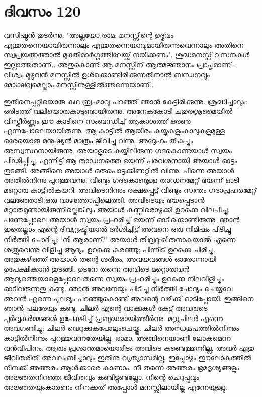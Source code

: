 \newpage
\section{ദിവസം 120}


വസിഷ്ഠന്‍ തുടര്‍ന്നു: "അല്ലയോ രാമ: മനസ്സിന്റെ ഉദ്ഭവം എന്തുതന്നെയായിരുന്നാലും എന്തുതന്നെയാവുമായിരുന്നുവെന്നാലും അതിനെ സ്വപ്രയത്നത്താല്‍ മുക്തിമാര്‍ഗ്ഗത്തിലേയ്ക്ക്‌ നയിക്കണം". ശുദ്ധമനസ്സ്‌ വസനകള്‍ ഇല്ലാത്തതാണ്‌.. അതുകൊണ്ട്‌ ആ മനസ്സിന്‌ ആത്മജ്ഞാനം പ്രാപ്തമാണ്‌.. വിശ്വം മുഴുവന്‍ മനസ്സില്‍ ഉള്‍ക്കൊണ്ടിരിക്കുന്നതിനാല്‍ ബന്ധനവും മോക്ഷവുമെല്ലാം മനസ്സിനുള്ളില്‍ത്തന്നെയാണ്‌..

ഇതിനെപ്പറ്റിയൊരു കഥ ബ്രഹ്മാവു പറഞ്ഞ്‌ ഞാന്‍ കേട്ടിരിക്കുന്നു. ശ്രദ്ധിച്ചാലും: ഒരിടത്ത്‌ വലിയൊരുകാടുണ്ടായിരുന്നു. അനേകകോടി ചതുരശ്രമൈയില്‍ വിസ്തീര്‍ണ്ണം ഈ കാടിനെ സംബന്ധിച്ച്‌ ആകാശത്ത്‌ ഒരണു എന്നപോലെയായിരുന്നു. ആ കാട്ടില്‍ ആയിരം കയ്യുകളുംകാലുകളുമുള്ള ഒരേയൊരു മനുഷ്യന്‍ മാത്രം ജീവിച്ചു വന്നു. അദ്ദേഹം തികച്ചും അസ്വസ്ഥനായിരുന്നു. അയാളുടെ കയ്യിലിരുന്ന ഗദകൊണ്ടയാള്‍ സ്വയം പീഢിപ്പിച്ചു. എന്നിട്ട്‌ ആ താഡനത്തെ ഭയന്ന് പരവശനായി അയാള്‍ ഓട്ടം തുടങ്ങി. അങ്ങിനെ അയാള്‍ ഒരുപൊട്ടക്കിണറ്റില്‍ വീണു. പിന്നെ അയാള്‍ അതില്‍നിന്നു പുറത്തുവന്നു; വീണ്ടും ഗദകൊണ്ടുള്ള താഡനമേറ്റ്‌ ഭയന്ന് ഓടി മറ്റൊരു കാട്ടില്‍കയറി. അവിടെനിന്നും രക്ഷപ്പെട്ട്‌ വീണ്ടും സ്വന്തം ഗദാപ്രഹരമേറ്റ്‌ വലഞ്ഞോടി ഒരു വാഴത്തോപ്പിലെത്തി. അവിടെയും  ഭയപ്പെടാന്‍ മറ്റാരുമുണ്ടായിരുന്നില്ലെങ്കിലും അയാള്‍ കണ്ണീരൊഴുക്കി ഉറക്കെ വിലപിച്ചു. പണ്ടേപ്പോലെ അയാള്‍ സ്വയം പ്രഹരിച്ച്‌ ഭയന്ന് ഓടിക്കൊണ്ടിരുന്നു. ഞാന്‍ ഇതെല്ലാം എന്റെ ദിവ്യദൃഷ്ടിയാല്‍ ദര്‍ശിച്ചിട്ട്‌ അവനെ ഒരു നിമിഷം പിടിച്ചു നിര്‍ത്തി ചോദിച്ചു: 'നീ ആരാണ്‌?' അയാള്‍ തീവ്രദു:ഖിതനാകയാല്‍ എന്നെ ശത്രുവെന്നു വിളിച്ചു ആദ്യം ഉറക്കെ കരഞ്ഞു; പിന്നീട്‌ ഉറക്കെ ചിരിച്ചു. അതുകഴിഞ്ഞ്‌ അയാള്‍ തന്റെ ശരീരം, അവയവങ്ങള്‍ ഓരോന്നായി ഉപേക്ഷിക്കാന്‍ തുടങ്ങി. ഉടനേ തന്നെ അവിടെ മറ്റൊരുവന്‍ ആദ്യത്തെയാളെപ്പോലെതന്നെ സ്വയം പ്രഹരിച്ചും ഉറക്കെ നിലവിളിച്ചും ഓടിവരുന്നതു കണ്ടു. ഞാന്‍ അവനേയും പിടിച്ചു നിര്‍ത്തി ചോദ്യം ചെയ്യവേ അവന്‍ എന്നെ പുലഭ്യം പറഞ്ഞുകൊണ്ട്‌ അവന്റെ വഴിക്ക്‌ ഓടിപ്പോയി. ഇങ്ങിനെ ഞാന്‍ പലരേയും കണ്ടു. ചിലര്‍ എന്റെ വാക്കുകള്‍ കേട്ട്‌ അവരുടെ പൂര്‍വ്വകര്‍മ്മങ്ങള്‍ ഉപേക്ഷിച്ച്‌ പ്രബുദ്ധരായിത്തീര്‍ന്നു. മറ്റുചിലര്‍ എന്നെ അവഗണിച്ചു; ചിലര്‍ വെറുക്കുകപോലുംചെയ്തു. ചിലര്‍ അന്ധകൂപത്തില്‍നിന്നും കാട്ടില്‍നിന്നും പുറത്തുവന്നതേയില്ല. രാമാ, അങ്ങിനെയാണീ ലോകമെന്ന വന്‍വിപിനം. ആരും പ്രശാന്തമായൊരിടം അവിടെ കണ്ടെത്തുന്നില്ല, അവര്‍ ഏതു ജീവിതരീതി അവലംബിച്ചാലും ഇതിനു വ്യത്യാസമില്ല. ഇപ്പോഴും ഈലോകത്തില്‍ നിനക്ക്‌ അത്തരം ആള്‍ക്കാരെ കാണാം. നീ തന്നെ അത്തരം ഭ്രമദൃശ്യങ്ങളും അജ്ഞതനിറഞ്ഞ ജീവിതവും കണ്ടിട്ടുണ്ടല്ലോ. നിന്റെ ചെറുപ്പവും അജ്ഞതയുംകാരണം നിനക്കത്‌ അപ്പോള്‍ മനസ്സിലായില്ല എന്നേയുള്ളു.  

